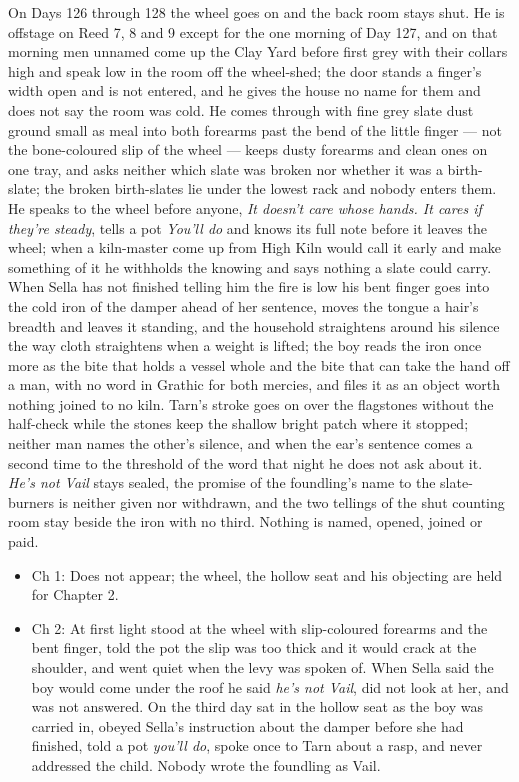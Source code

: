 \documentclass{design/chronicle}
\begin{document}
{On Days 126 through 128 the wheel goes on and the back room stays shut. He is offstage on Reed 7, 8 and 9 except for the one morning of Day 127, and on that morning men unnamed come up the Clay Yard before first grey with their collars high and speak low in the room off the wheel-shed; the door stands a finger’s width open and is not entered, and he gives the house no name for them and does not say the room was cold. He comes through with fine grey slate dust ground small as meal into both forearms past the bend of the little finger — not the bone-coloured slip of the wheel — keeps dusty forearms and clean ones on one tray, and asks neither which slate was broken nor whether it was a birth-slate; the broken birth-slates lie under the lowest rack and nobody enters them. He speaks to the wheel before anyone, \emph{It doesn’t care whose hands. It cares if they’re steady}, tells a pot \emph{You’ll do} and knows its full note before it leaves the wheel; when a kiln-master come up from High Kiln would call it early and make something of it he withholds the knowing and says nothing a slate could carry. When Sella has not finished telling him the fire is low his bent finger goes into the cold iron of the damper ahead of her sentence, moves the tongue a hair’s breadth and leaves it standing, and the household straightens around his silence the way cloth straightens when a weight is lifted; the boy reads the iron once more as the bite that holds a vessel whole and the bite that can take the hand off a man, with no word in Grathic for both mercies, and files it as an object worth nothing joined to no kiln. Tarn’s stroke goes on over the flagstones without the half-check while the stones keep the shallow bright patch where it stopped; neither man names the other’s silence, and when the ear’s sentence comes a second time to the threshold of the word that night he does not ask about it. \emph{He’s not Vail} stays sealed, the promise of the foundling’s name to the slate-burners is neither given nor withdrawn, and the two tellings of the shut counting room stay beside the iron with no third. Nothing is named, opened, joined or paid.

\begin{itemize}[leftmargin=1.4em,itemsep=1pt,topsep=3pt,parsep=0pt]

\item Ch 1: Does not appear; the wheel, the hollow seat and his objecting are held for Chapter 2.

\item Ch 2: At first light stood at the wheel with slip-coloured forearms and the bent finger, told the pot the slip was too thick and it would crack at the shoulder, and went quiet when the levy was spoken of. When Sella said the boy would come under the roof he said \emph{he’s not Vail}, did not look at her, and was not answered. On the third day sat in the hollow seat as the boy was carried in, obeyed Sella’s instruction about the damper before she had finished, told a pot \emph{you’ll do}, spoke once to Tarn about a rasp, and never addressed the child. Nobody wrote the foundling as Vail.


\end{itemize}}
\end{document}
